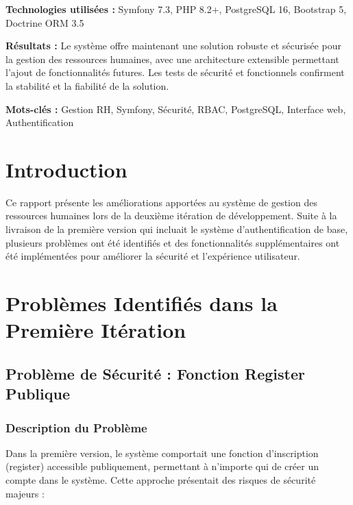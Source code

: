 \documentclass[12pt,a4paper]{article}
\begin{document}
\textbf{Technologies utilisées :} Symfony 7.3, PHP 8.2+, PostgreSQL 16, Bootstrap 5, Doctrine ORM 3.5

\textbf{Résultats :} Le système offre maintenant une solution robuste et sécurisée pour la gestion des ressources humaines, avec une architecture extensible permettant l'ajout de fonctionnalités futures. Les tests de sécurité et fonctionnels confirment la stabilité et la fiabilité de la solution.

\textbf{Mots-clés :} Gestion RH, Symfony, Sécurité, RBAC, PostgreSQL, Interface web, Authentification

\newpage
{}
\setcounter{page}{1}

\pagestyle{fancy}
\fancyhf{}
\fancyhead[R]{\thepage}

\section{Introduction}

Ce rapport présente les améliorations apportées au système de gestion des ressources humaines lors de la deuxième itération de développement. Suite à la livraison de la première version qui incluait le système d'authentification de base, plusieurs problèmes ont été identifiés et des fonctionnalités supplémentaires ont été implémentées pour améliorer la sécurité et l'expérience utilisateur.

\section{Problèmes Identifiés dans la Première Itération}

\subsection{Problème de Sécurité : Fonction Register Publique}

\subsubsection{Description du Problème}
Dans la première version, le système comportait une fonction d'inscription (register) accessible publiquement, permettant à n'importe qui de créer un compte dans le système. Cette approche présentait des risques de sécurité majeurs :
\end{document}
